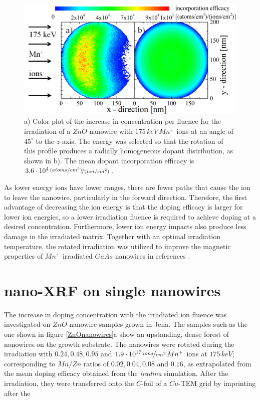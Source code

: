 \begin{figure}
	\centering
		\includegraphics[width=.8\textwidth]{images/iradinacrosssection.png}
	\caption{a) Color plot of the increase in concentration per fluence for the irradiation of a $ZnO$ nanowire with $175\,keV\,Mn^+$ ions at an angle of $45^\circ$ to the $z$-axis. The energy was selected so that the rotation of this profile produces a radially homogeneous dopant distribution, as shown in b). The mean dopant incorporation efficacy is $3.6\cdot10^4\,\nicefrac{(atoms/cm^3)}{(ion/cm^2)}$.}
	\label{iradinacrossection}
\end{figure} 

As lower energy ions have lower ranges, there are fewer paths that cause the ion to leave the nanowire, particularly in the forward direction. Therefore, the first advantage of decreasing the ion energy is that the doping efficacy is larger for lower ion energies, so a lower irradiation fluence is required to achieve doping at a desired concentration. Furthermore, lower ion energy impacts also produce less damage in the irradiated matrix. Together with an optimal irradiation temperature, the rotated irradiation was utilized to improve the magnetic properties of $Mn^+$ irradiated $GaAs$ nanowires in references \cite{borschel_new_2011,paschoal_hopping_2012,borschel_ion-solid_2012,kumar_magnetic_2013,paschoal_magnetoresistance_2014}. 




\section{nano-XRF on single nanowires}

The increase in doping concentration with the irradiated ion fluence was investigated on $ZnO$ nanowire samples grown in Jena. The samples such as the one shown in figure \ref{ZnOnanowires}a show an upstanding, dense forest of nanowires on the growth substrate. The nanowires were rotated during the irradiation with $0.24, 0.48, 0.95$ and $1.9\cdot 10^{17}\,\nicefrac{ions}{cm^2}\,Mn^+$ ions at $175\,keV$; corresponding to $Mn/Zn$ ratios of $0.02, 0.04, 0.08$ and $0.16$, as extrapolated from the mean doping efficacy obtained from the \emph{iradina} simulation. After the irradiation, they were transferred onto the $C$-foil of a $Cu$-TEM grid by imprinting after the

